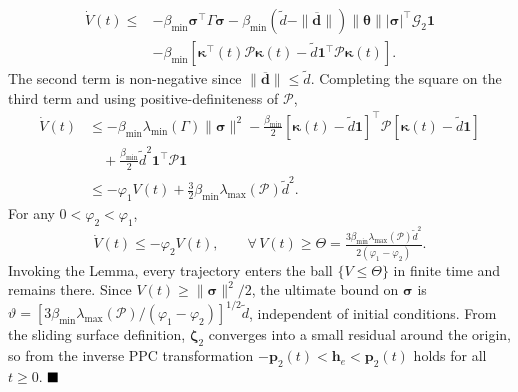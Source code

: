 \documentclass[10pt,journal]{IEEEtran}
\begin{document}
\begin{align*}
\dot{V}(t)\le& -\beta_{\min}\boldsymbol{\sigma}^\top\Gamma\boldsymbol{\sigma} - \beta_{\min}(\tilde{d}-\|\boldsymbol{\overline{d}}\|)\|\boldsymbol{\theta}\||\boldsymbol{\sigma}|^\top\mathcal{G}_2\boldsymbol{1}\\
&- \beta_{\min}[\boldsymbol{\kappa}^\top(t)\mathcal{P}\boldsymbol{\kappa}(t) - \tilde{d}\boldsymbol{1}^\top\mathcal{P}\boldsymbol{\kappa}(t)].
\end{align*}
The second term is non-negative since $\|\boldsymbol{\overline{d}}\|\le\tilde{d}$. Completing the square on the third term and using positive-definiteness of $\mathcal{P}$,
\begin{align*}
\dot{V}(t)&\le -\beta_{\min}\lambda_{\min}(\Gamma)\|\boldsymbol{\sigma}\|^2 - \tfrac{\beta_{\min}}{2}[\boldsymbol{\kappa}(t)-\tilde{d}\boldsymbol{1}]^\top\mathcal{P}[\boldsymbol{\kappa}(t)-\tilde{d}\boldsymbol{1}]\\
&\quad + \tfrac{\beta_{\min}}{2}\tilde{d}^2\boldsymbol{1}^\top\mathcal{P}\boldsymbol{1}\\
&\le -\varphi_1 V(t) + \tfrac32\beta_{\min}\lambda_{\max}(\mathcal{P})\tilde{d}^2.
\end{align*}
For any $0<\varphi_2<\varphi_1$,
\begin{equation*}
\dot{V}(t)\le -\varphi_2 V(t),\qquad \forall\,V(t)\ge\Theta=\tfrac{3\beta_{\min}\lambda_{\max}(\mathcal{P})\tilde{d}^2}{2(\varphi_1-\varphi_2)}.
\end{equation*}
Invoking the Lemma, every trajectory enters the ball $\{V\le\Theta\}$ in finite time and remains there. Since $V(t)\ge\|\boldsymbol{\sigma}\|^2/2$, the ultimate bound on $\boldsymbol{\sigma}$ is $\vartheta = [3\beta_{\min}\lambda_{\max}(\mathcal{P})/(\varphi_1-\varphi_2)]^{1/2}\tilde{d}$, independent of initial conditions. From the sliding surface definition, $\boldsymbol{\zeta}_2$ converges into a small residual around the origin, so from the inverse PPC transformation $-\boldsymbol{p}_2(t)<\boldsymbol{h}_e<\boldsymbol{p}_2(t)$ holds for all $t\ge 0$. $\hfill\blacksquare$
\end{document}
